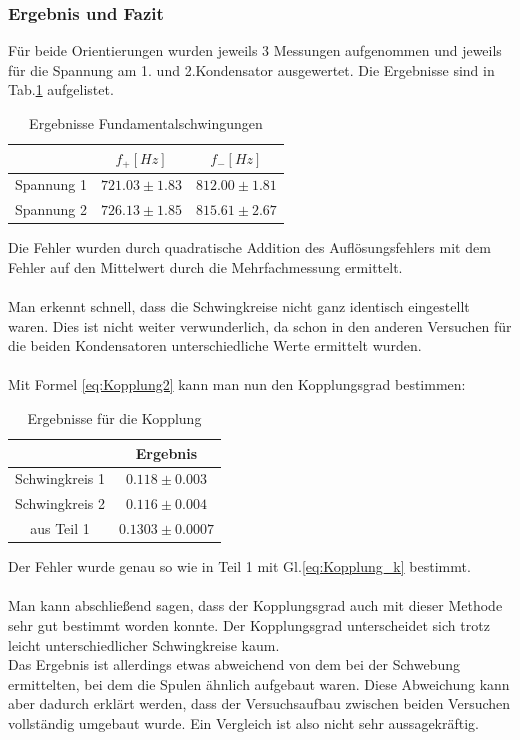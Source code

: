 \documentclass[12pt,a4paper]{article}
\begin{document}
\subsubsection{Ergebnis und Fazit}
Für beide Orientierungen wurden jeweils 3 Messungen aufgenommen und jeweils für die Spannung am 1. und 2.Kondensator ausgewertet. Die Ergebnisse sind in Tab.\ref{tab:Fund_Ergebnis} aufgelistet.

\begin{table}[H]
\begin{center}
\begin{tabular}{|c|c|c|}
\hline 
 & $f_+[Hz]$ & $f_-[Hz]$ \\ 
\hline 
Spannung 1 & $721.03\pm1.83$ & $812.00\pm1.81$ \\ 
\hline 
Spannung 2 & $726.13\pm1.85$ & $815.61\pm2.67$ \\ 
\hline 
\end{tabular} 
\end{center}
\label{tab:Fund_Ergebnis}
\caption{Ergebnisse Fundamentalschwingungen}
\end{table}

Die Fehler wurden durch quadratische Addition des Auflösungsfehlers mit dem Fehler auf den Mittelwert durch die Mehrfachmessung ermittelt. \\
\\
Man erkennt schnell, dass die Schwingkreise nicht ganz identisch eingestellt waren. Dies ist nicht weiter verwunderlich, da schon in den anderen Versuchen für die beiden Kondensatoren unterschiedliche Werte ermittelt wurden.\\
\\
Mit Formel \ref{eq:Kopplung2} kann man nun den Kopplungsgrad bestimmen:

\begin{table}[H]
\begin{center}
\begin{tabular}{|c|c|}
\hline 
 & Ergebnis\\ 
\hline 
Schwingkreis 1  & $0.118\pm 0.003$ \\ 
\hline 
Schwingkreis 2 & $0.116\pm  0.004$\\ 
\hline 
aus Teil 1 & $0.1303\pm  0.0007$\\ 
\hline 
\end{tabular} 
\end{center}
\label{tab:Ergebnisse_k}
\caption{Ergebnisse für die Kopplung}
\end{table}

Der Fehler wurde genau so wie in Teil 1 mit Gl.\ref{eq:Kopplung_k} bestimmt.\\
\\
Man kann abschließend sagen, dass der Kopplungsgrad auch mit dieser Methode sehr gut bestimmt worden konnte. Der Kopplungsgrad unterscheidet sich trotz leicht unterschiedlicher Schwingkreise kaum.\\
Das Ergebnis ist allerdings etwas abweichend von dem bei der Schwebung ermittelten, bei dem die Spulen ähnlich aufgebaut waren. Diese Abweichung kann aber dadurch erklärt werden, dass der Versuchsaufbau zwischen beiden Versuchen vollständig umgebaut wurde. Ein Vergleich ist also nicht sehr aussagekräftig.
\end{document}

